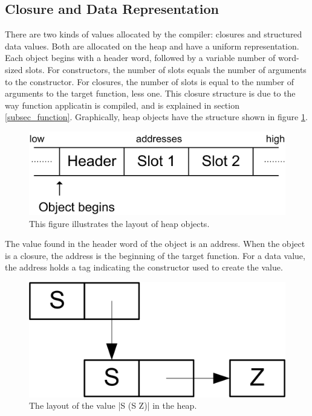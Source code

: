 \documentclass[11pt]{article}
\begin{document}
\subsection{Closure and Data Representation}
\label{subsec_closure}
There are two kinds of values allocated by the compiler: closures and
structured data values. Both are allocated on the heap and have a
uniform representation. Each object begins with a header word,
followed by a variable number of word-sized slots. For constructors,
the number of slots equals the number of arguments to the
constructor. For closures, the number of slots is equal to the number
of arguments to the target function, less one. This closure structure
is due to the way function applicatin is compiled, and is explained in
section \ref{subsec_function}. Graphically, heap
objects have the structure shown in figure \ref{fig_Heap}.

\begin{figure}\centering
\includegraphics{fig_Heap}
\caption{This figure illustrates the layout of heap objects.}
\label{fig_Heap}
\end{figure}

The value found in the header word of the object is an address. When
the object is a closure, the address is the beginning of the target
function. For a data value, the address holds a tag indicating the
constructor used to create the value.

\begin{figure}\centering
\includegraphics{fig_HeapExample}
\caption{The layout of the value |S (S Z)| in the heap.}
\label{fig_HeapExample}
\end{figure}
\end{document}
